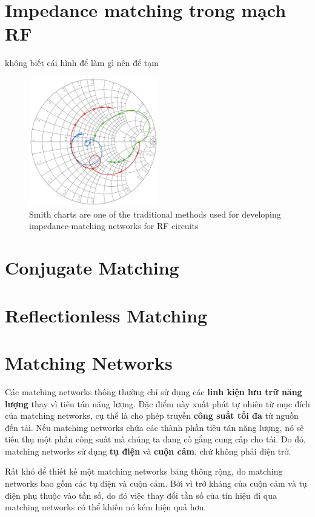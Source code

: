     \section{Impedance matching trong mạch RF}
        không biết cái hình để làm gì nên để tạm\cite{cadence_impedance}
        \begin{figure}[h]
            \centering
            \includegraphics[width=0.5\textwidth]{figures/smith_chart.png}
            \caption{Smith charts are one of the traditional methods used for developing impedance-matching networks for RF circuits}
            \label{fig:smith_chart}
        \end{figure}

    \section{Conjugate Matching}
    \section{Reflectionless Matching}
    \cite{cadence2021conjugatematching}
    
    \section{Matching Networks}
        Các matching networks thông thường chỉ sử dụng các \textbf{linh kiện lưu trữ năng lượng} 
        thay vì tiêu tán năng lượng. Đặc điểm này xuất phát tự nhiên từ mục đích 
        của matching networks, cụ thể là cho phép truyền \textbf{công suất tối đa} từ nguồn đến tải. 
        Nếu matching networks chứa các thành phần tiêu tán năng lượng, nó sẽ tiêu thụ một phần công suất 
        mà chúng ta đang cố gắng cung cấp cho tải. Do đó, matching networks sử dụng \textbf{tụ điện} 
        và \textbf{cuộn cảm}, chứ không phải điện trở.\cite{allaboutcircuits_matchingNetworks}\par

        Rất khó để thiết kế một matching networks băng thông rộng, do matching networks bao gồm các tụ điện và cuộn cảm.
        Bởi vì trở kháng của cuộn cảm và tụ điện phụ thuộc vào tần số, do đó việc thay đổi tần số của tín hiệu đi qua matching networks 
        có thể khiến nó kém hiệu quả hơn.\par